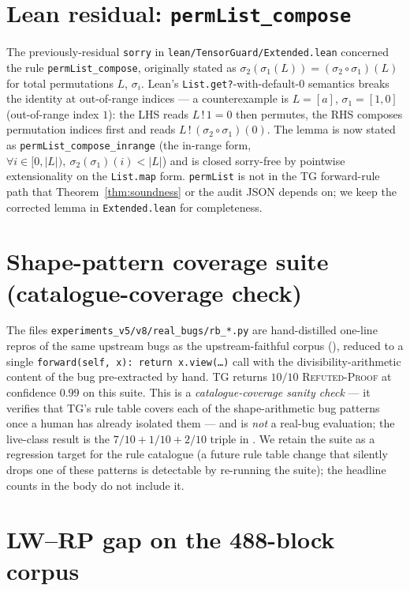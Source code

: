 \section{Lean residual: \texttt{permList\_compose}}
\label{app:lean-residual}
The previously-residual \texttt{sorry} in
\texttt{lean/TensorGuard/Extended.lean} concerned the rule
\texttt{permList\_compose}, originally stated as
$\sigma_2(\sigma_1(L))=(\sigma_2\circ\sigma_1)(L)$ for total
permutations $L$, $\sigma_i$.  Lean's
\texttt{List.get?}-with-default-$0$ semantics breaks the
identity at out-of-range indices --- a counterexample is
$L{=}[a]$, $\sigma_1{=}[1,0]$ (out-of-range index $1$):
the LHS reads $L\,!\,1{=}0$ then permutes, the RHS composes
permutation indices first and reads $L\,!\,(\sigma_2\circ\sigma_1)(0)$.
The lemma is now stated as
\texttt{permList\_compose\_inrange} (the in-range form,
$\forall i\in[0,|L|),~\sigma_2(\sigma_1)(i)<|L|$) and is closed
sorry-free by pointwise extensionality on the
\texttt{List.map} form.  \texttt{permList} is not in the
\textsc{TG} forward-rule path that Theorem~\ref{thm:soundness}
or the audit JSON depends on; we keep the corrected lemma in
\texttt{Extended.lean} for completeness.

\section{Shape-pattern coverage suite (catalogue-coverage check)}
\label{app:catalogue-coverage}

The files \texttt{experiments\_v5/v8/real\_bugs/rb\_*.py} are
hand-distilled one-line repros of the same upstream bugs as the
upstream-faithful corpus (), reduced to a
single
\texttt{forward(self, x): return x.view(\ldots)} call with the
divisibility-arithmetic content of the bug pre-extracted by hand.
\textsc{TG} returns $10/10$ \textsc{Refuted-Proof} at confidence
$0.99$ on this suite.  This is a \emph{catalogue-coverage sanity
check} --- it verifies that TG's rule table covers each of the
shape-arithmetic bug patterns once a human has already isolated
them --- and is \emph{not} a real-bug evaluation; the live-class
result is the $7/10 + 1/10 + 2/10$ triple in
.  We retain the suite as a regression
target for the rule catalogue (a future rule table change that
silently drops one of these patterns is detectable by re-running
the suite); the headline counts in the body do not include it.

\section{LW--RP gap on the 488-block corpus}
\label{app:lw-rp-gap}

